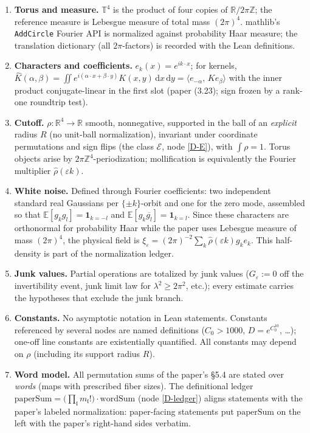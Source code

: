 \begin{enumerate}
\item \textbf{Torus and measure.} \(\mathbb{T}^4\) is the product of four
  copies of \(\mathbb{R}/2\pi\mathbb{Z}\); the reference measure is Lebesgue
  measure of total mass \((2\pi)^4\). mathlib's \texttt{AddCircle} Fourier
  API is normalized against probability Haar measure; the translation
  dictionary (all \(2\pi\)-factors) is recorded with the Lean definitions.
\item \textbf{Characters and coefficients.} \(e_k(x) = e^{i k\cdot x}\);
  for kernels, \(\widehat K(\alpha,\beta)
  = \iint e^{i(\alpha\cdot x + \beta\cdot y)}K(x,y)\,\mathrm{d}x\,
  \mathrm{d}y = \langle e_{-\alpha},\, K e_\beta\rangle\) with the inner
  product conjugate-linear in the first slot (paper (3.23); sign frozen by
  a rank-one roundtrip test).
\item \textbf{Cutoff.} \(\rho\colon\mathbb{R}^4 \to \mathbb{R}\) smooth,
  nonnegative, supported in the ball of an \emph{explicit} radius \(R\)
  (no unit-ball normalization), invariant under coordinate permutations
  and sign flips (the class \(\mathcal{E}\), node \ref{D-E}), with
  \(\int\rho = 1\). Torus objects arise by \(2\pi\mathbb{Z}^4\)-periodization;
  mollification is equivalently the Fourier multiplier
  \(\widehat{\rho}(\varepsilon k)\).
\item \textbf{White noise.} Defined through Fourier coefficients: two
  independent standard real Gaussians per \(\{\pm k\}\)-orbit and one for
  the zero mode, assembled so that
  \(\mathbb{E}[g_k g_l] = \mathbf{1}_{k=-l}\) and
  \(\mathbb{E}[g_k \overline{g_l}] = \mathbf{1}_{k=l}\). Since these
  characters are orthonormal for probability Haar while the paper uses
  Lebesgue measure of mass \((2\pi)^4\), the physical field is
  \(\xi_\varepsilon=(2\pi)^{-2}\sum_k
  \widehat\rho(\varepsilon k)g_ke_k\). This half-density is part of the
  normalization ledger.
\item \textbf{Junk values.} Partial operations are totalized by junk
  values (\(G_\varepsilon := 0\) off the invertibility event, junk limit law
  for \(\lambda^2 \ge 2\pi^2\), etc.); every estimate carries the
  hypotheses that exclude the junk branch.
\item \textbf{Constants.} No asymptotic notation in Lean statements.
  Constants referenced by several nodes are named definitions
  (\(C_0 > 1000\), \(D = e^{C_0^{10}}\), \dots); one-off line constants
  are existentially quantified. All constants may depend on \(\rho\)
  (including its support radius \(R\)).
\item \textbf{Word model.} All permutation sums of the paper's \S5.4 are
  stated over \emph{words} (maps with prescribed fiber sizes). The
  definitional ledger
  \(\mathrm{paperSum} = \big(\prod_{\mathfrak{l}} m_{\mathfrak{l}}!\big)
  \cdot \mathrm{wordSum}\) (node \ref{D-ledger}) aligns statements with
  the paper's labeled normalization: paper-facing statements put
  \(\mathrm{paperSum}\) on the left with the paper's right-hand sides
  verbatim.
\end{enumerate}

